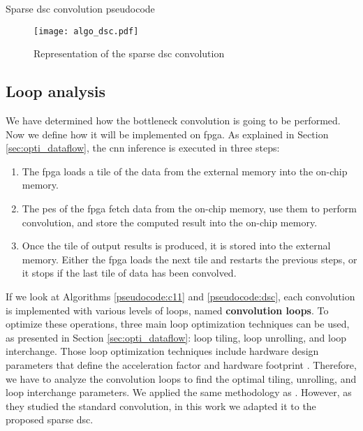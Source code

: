 \begin{enumerate}
\begin{algorithm}[H]
\begin{algorithmic}
                        \EndFor
                    \EndFor
                \EndFor
            \EndFor
        \end{algorithmic}
        \caption{Sparse \acrshort{dsc} convolution pseudocode}
        \label{pseudocode:dsc}
    \end{algorithm}
    \begin{figure}[H]
        \centering
        \texttt{[image: algo\_dsc.pdf]}
        \caption{Representation of the sparse \acrshort{dsc} convolution}
        \label{fig:algo_dsc}
    \end{figure}
\end{enumerate}
%
\subsection{Loop analysis}
%
We have determined how the bottleneck convolution is going to be performed. Now we define how it will be implemented on \acrshort{fpga}. As explained in Section \ref{sec:opti_dataflow}, the \acrshort{cnn} inference is executed in three steps:
%
\begin{enumerate}
    \item The \acrshort{fpga} loads a tile of the data from the external memory into the on-chip memory.
    \item The \acrshort{pe}s of the \acrshort{fpga} fetch data from the on-chip memory, use them to perform convolution, and store the computed result into the on-chip memory.
    \item Once the tile of output results is produced, it is stored into the external memory. Either the \acrshort{fpga} loads the next tile and restarts the previous steps, or it stops if the last tile of data has been convolved.
\end{enumerate}
%
If we look at Algorithms \ref{pseudocode:c11} and \ref{pseudocode:dsc}, each convolution is implemented with various levels of loops, named \textbf{convolution loops}. To optimize these operations, three main loop optimization techniques can be used, as presented in Section \ref{sec:opti_dataflow}: loop tiling, loop unrolling, and loop interchange. Those loop optimization techniques include hardware design parameters that define the acceleration factor and hardware footprint \cite{ma_optimizing_2018}. Therefore, we have to analyze the convolution loops to find the optimal tiling, unrolling, and loop interchange parameters. We applied the same methodology as \textcite{ma_optimizing_2018}. However, as they studied the standard convolution, in this work we adapted it to the proposed sparse \acrshort{dsc}.\cite{ma_optimizing_2018}

